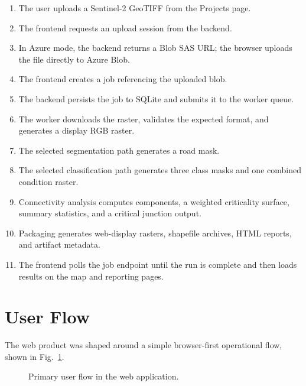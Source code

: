 \documentclass[conference]{IEEEtran}
\begin{document}
\begin{enumerate}[leftmargin=16pt]
\item The user uploads a Sentinel-2 GeoTIFF from the Projects page.
\item The frontend requests an upload session from the backend.
\item In Azure mode, the backend returns a Blob SAS URL; the browser uploads the
file directly to Azure Blob.
\item The frontend creates a job referencing the uploaded blob.
\item The backend persists the job to SQLite and submits it to the worker queue.
\item The worker downloads the raster, validates the expected format, and
generates a display RGB raster.
\item The selected segmentation path generates a road mask.
\item The selected classification path generates three class masks and one
combined condition raster.
\item Connectivity analysis computes components, a weighted criticality surface,
summary statistics, and a critical junction output.
\item Packaging generates web-display rasters, shapefile archives, HTML reports,
and artifact metadata.
\item The frontend polls the job endpoint until the run is complete and then
loads results on the map and reporting pages.
\end{enumerate}

\section{User Flow}
The web product was shaped around a simple browser-first operational flow, shown
in Fig.~\ref{fig:userflow}.

\begin{figure}[t]
\centering
{}
\caption{Primary user flow in the web application.}
\label{fig:userflow}
\end{figure}
\end{document}
